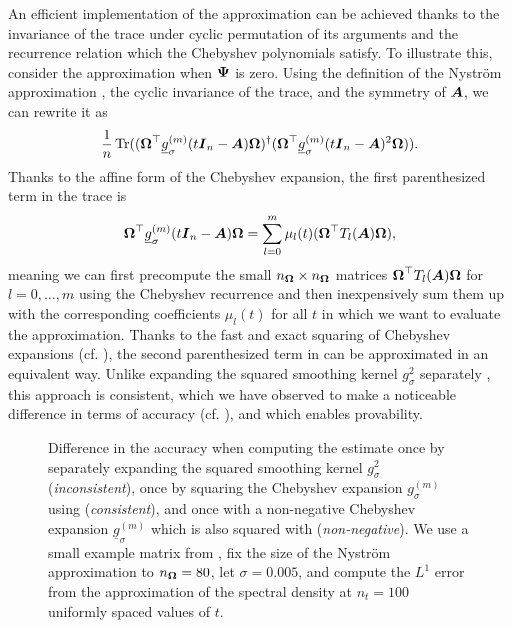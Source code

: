 An efficient implementation of the approximation  can be achieved thanks to the invariance of the trace under cyclic permutation of its arguments and the recurrence relation  which the Chebyshev polynomials satisfy. To illustrate this, consider the approximation  when $\boldsymbol{\Psi}$ is zero. Using the definition of the Nyström approximation , the cyclic invariance of the trace, and the symmetry of $\boldsymbol{A}$, we can rewrite it as
\begin{equation}
    \frac{1}{n} \operatorname{Tr}((\boldsymbol{\Omega}^{\top} \underline{g}^{(m)}_{\sigma}(t \boldsymbol{I}_n - \boldsymbol{A}) \boldsymbol{\Omega})^{\dagger} (\boldsymbol{\Omega}^{\top} \underline{g}^{(m)}_{\sigma}(t \boldsymbol{I}_n - \boldsymbol{A})^2 \boldsymbol{\Omega})).
    \label{equ:cyclic-property}
\end{equation}
Thanks to the affine form of the Chebyshev expansion, the first parenthesized term in the trace is
\begin{equation}
    \boldsymbol{\Omega}^{\top} \underline{g}^{(m)}_{\sigma}(t \boldsymbol{I}_n - \boldsymbol{A}) \boldsymbol{\Omega} = \sum_{l=0}^{m} \mu_l(t) (\boldsymbol{\Omega}^{\top} T_l(\boldsymbol{A}) \boldsymbol{\Omega}),
\end{equation}
meaning we can first precompute the small $n_{\boldsymbol{\Omega}} \times n_{\boldsymbol{\Omega}}$ matrices $\boldsymbol{\Omega}^{\top} T_l(\boldsymbol{A}) \boldsymbol{\Omega}$ for $l=0, \dots, m$ using the Chebyshev recurrence  and then inexpensively sum them up with the corresponding coefficients $\mu_l(t)$ for all $t$ in which we want to evaluate the approximation. Thanks to the fast and exact squaring of Chebyshev expansions (cf. ), the second parenthesized term in  can be approximated in an equivalent way. Unlike expanding the squared smoothing kernel $g_{\sigma}^2$ separately \cite{lin-2017-randomized-estimation}, this approach is consistent, which we have observed to make a noticeable difference in terms of accuracy (cf. ), and which enables provability. 

\begin{figure}[ht]
    \centering
    
    \caption{Difference in the accuracy when computing the estimate  once by separately expanding the squared smoothing kernel $g_{\sigma}^2$ (\emph{inconsistent}), once by squaring the Chebyshev expansion $g_{\sigma}^{(m)}$ using  (\emph{consistent}), and once with a non-negative Chebyshev expansion $\underline{g}_{\sigma}^{(m)}$  which is also squared with  (\emph{non-negative}). We use a small example matrix from , fix the size of the Nyström approximation to $n_{\boldsymbol{\Omega}} = 80$, let $\sigma = 0.005$, and compute the $L^1$ error from the approximation of the spectral density at $n_t = 100$ uniformly spaced values of $t$.}
    \label{fig:interpolation-issue}
\end{figure}

